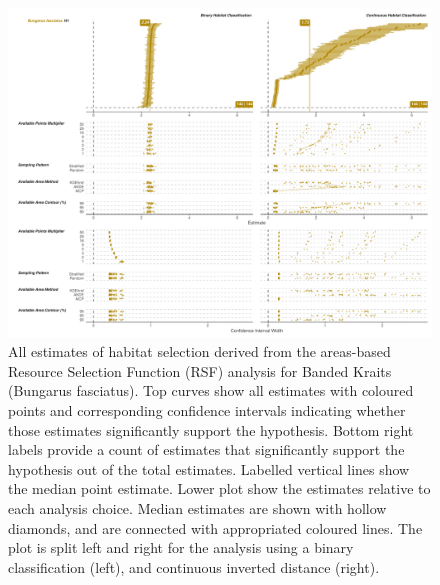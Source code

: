 \documentclass[10pt,a4paper]{article}
\begin{document}
\begin{figure}
\includegraphics[width=1\linewidth]{../../figures/specCurve_Bungarus fasciatus_rsf} \caption{All estimates of habitat selection derived from the areas-based Resource Selection Function (RSF) analysis for Banded Kraits (Bungarus fasciatus). Top curves show all estimates with coloured points and corresponding confidence intervals indicating whether those estimates significantly support the hypothesis. Bottom right labels provide a count of estimates that significantly support the hypothesis out of the total estimates. Labelled vertical lines show the median point estimate. Lower plot show the estimates relative to each analysis choice. Median estimates are shown with hollow diamonds, and are connected with appropriated coloured lines. The plot is split left and right for the analysis using a binary classification (left), and continuous inverted distance (right).}\label{fig:specCurveRsfBUFA}
\end{figure}
\end{document}

